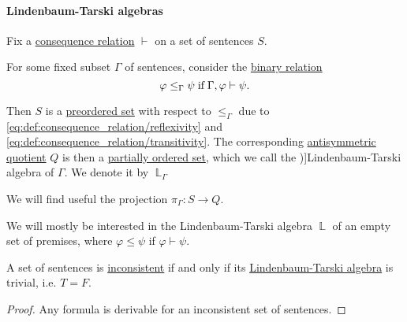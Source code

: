 \paragraph{Lindenbaum-Tarski algebras}

\begin{definition}\label{def:lindenbaum_tarski_algebra}
  Fix a \hyperref[def:consequence_relation]{consequence relation} \( {\vdash} \) on a set of sentences \( S \).

  For some fixed subset \( \Gamma \) of sentences, consider the \hyperref[def:binary_relation]{binary relation}
  \begin{equation*}
    \varphi \leq_\Gamma \psi \T{if} \Gamma, \varphi \vdash \psi.
  \end{equation*}

  Then \( S \) is a \hyperref[def:preordered_set]{preordered set} with respect to \( \leq_\Gamma \) due to \eqref{eq:def:consequence_relation/reflexivity} and \eqref{eq:def:consequence_relation/transitivity}. The corresponding \hyperref[def:antisymmetric_quotient]{antisymmetric quotient} \( Q \) is then a \hyperref[def:partially_ordered_set]{partially ordered set}, which we call the \term[ru=алгебра Линденбаума-Тарского, en=Lindenbaum-Tarski algebra (\cite[def. 6.3.1]{CitkinMuravitsky2022ConsequenceRelations})]{Lindenbaum-Tarski algebra} of \( \Gamma \). We denote it by \( \BbbL_\Gamma \)
\end{definition}
\begin{comments}
  \item We will find useful the projection \( \pi_\Gamma: S \to Q \).

  \item We will mostly be interested in the Lindenbaum-Tarski algebra \( \BbbL \) of an empty set of premises, where \( \varphi \leq \psi \) if \( \varphi \vdash \psi \).
\end{comments}

\begin{proposition}\label{thm:inconsistent_lindenbaum_tarski_algebra}
  A set of sentences is \hyperref[def:consistent_set_of_sentences]{inconsistent} if and only if its \hyperref[def:lindenbaum_tarski_algebra]{Lindenbaum-Tarski algebra} is trivial, i.e. \( T = F \).
\end{proposition}
\begin{proof}
  Any formula is derivable for an inconsistent set of sentences.
\end{proof}

